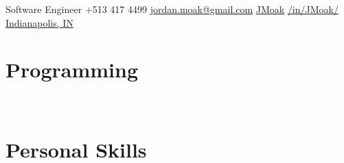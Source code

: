 \documentclass[]{moak-resume}
\begin{document}
            {Software Engineer}
            {\icon{\faPhone} +513 417 4499}
            {\icon{\faEnvelope[regular]} \href{mailto:ordan.moak@gmail.com}{ jordan.moak@gmail.com}}
            {\icon{\faGithub} \href{https://github.com/JMoak/}{ JMoak}}
            {\icon{\faLinkedin} \href{https://www.linkedin.com/JMoak}{ /in/JMoak/}}
            {\icon{\faMapMarker} \href{https://www.google.com/maps/dir/Indianapolis,+IN/10661+N+Park+Ave,+Indianapolis,+IN+46280/@39.855518,-86.2220929,12z/data=!3m1!4b1!4m13!4m12!1m5!1m1!1s0x886b50ffa7796a03:0xd68e9df640b9ea7c!2m2!1d-86.158068!2d39.768403!1m5!1m1!1s0x8814ace9334d6b09:0x27cc5b30c43341c1!2m2!1d-86.1480884!2d39.943121}{ Indianapolis, IN}}

\begin{aside}
  \section{Programming}
	\programmingPie{}
  ~
  \section{Personal Skills}
    ~
\end{aside}
~
\end{document}
